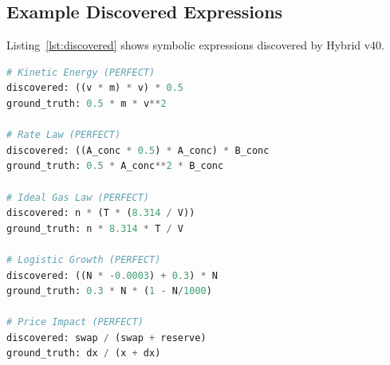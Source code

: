 \documentclass[twoside,11pt]{article}
\begin{document}
\subsection{Example Discovered Expressions}

Listing~\ref{lst:discovered} shows symbolic expressions discovered by Hybrid v40.

\begin{lstlisting}[caption=Discovered Symbolic Expressions, label=lst:discovered, language=Python]
# Kinetic Energy (PERFECT)
discovered: ((v * m) * v) * 0.5
ground_truth: 0.5 * m * v**2

# Rate Law (PERFECT)
discovered: ((A_conc * 0.5) * A_conc) * B_conc
ground_truth: 0.5 * A_conc**2 * B_conc

# Ideal Gas Law (PERFECT)
discovered: n * (T * (8.314 / V))
ground_truth: n * 8.314 * T / V

# Logistic Growth (PERFECT)
discovered: ((N * -0.0003) + 0.3) * N
ground_truth: 0.3 * N * (1 - N/1000)

# Price Impact (PERFECT)
discovered: swap / (swap + reserve)
ground_truth: dx / (x + dx)
\end{lstlisting}
\end{document}
